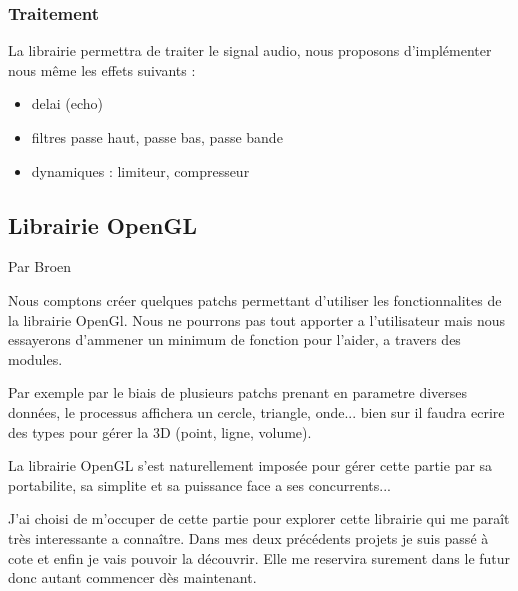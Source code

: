 \documentclass[14pt,a4paper]{article}
\begin{document}
\subsubsection{Traitement}
La librairie permettra de traiter le signal audio, nous proposons
d'impl\'ementer nous m\^eme les effets suivants :
\begin{itemize}
\item delai (echo)
\item filtres passe haut, passe bas, passe bande
\item dynamiques : limiteur, compresseur
\end{itemize}

\subsection{Librairie OpenGL}
Par Broen\\
\par
Nous comptons cr\'eer quelques patchs permettant d'utiliser les
 fonctionnalites de la  librairie OpenGl. Nous ne pourrons pas tout
 apporter a l'utilisateur mais nous essayerons d'ammener un minimum
 de fonction pour l'aider, a travers des modules.
\\
\par
 Par exemple par le biais de plusieurs patchs prenant en parametre
 diverses donn\'ees, le processus affichera un cercle, triangle, onde...
 bien sur il faudra ecrire des types pour g\'erer la 3D
 (point, ligne, volume).\\
\par
La librairie OpenGL s'est naturellement impos\'ee pour g\'erer
 cette partie par sa portabilite, sa simplite et sa puissance
 face a ses concurrents...\\
\par
J'ai choisi de m'occuper de cette partie pour explorer cette librairie
 qui me para\^it tr\`es interessante a conna\^itre. Dans mes deux
 pr\'ec\'edents projets je suis pass\'e \`a cote et enfin je vais
 pouvoir la d\'ecouvrir. Elle me reservira surement dans le futur
 donc autant commencer d\`es maintenant.
\end{document}
